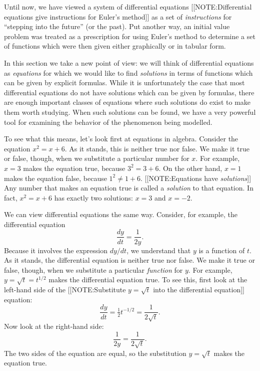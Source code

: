 Until now, we have viewed a system of differential equations
[[NOTE:Differential equations give instructions for Euler's method]]
as a set of {\em instructions\/} for ``stepping into the future'' (or
the past).  Put another way, an initial value problem was treated as a
prescription for using Euler's method to
determine a set of functions which were then given either graphically
or in tabular form.

In this section we take a new point of view: we will think of
differential equations as {\em equations\/} for which
we would like to find {\em solutions} in terms of
functions which can be given by explicit formulas.  While it is
unfortunately the case that most differential equations do not have
solutions which can be given by formulas, there are enough important
classes of equations where such solutions do exist to make them worth
studying.  When such solutions can be found, we have a very powerful
tool for examining the behavior of the phenomenon being modelled.

To see what this means, let's look first at equations in algebra.
Consider the equation $x^2 = x + 6$.  As it stands, this is neither
true nor false.  We make it true or false, though, when we substitute
a particular number for $x$.  For example, $x = 3$ makes the equation
true, because $3^2 = 3 + 6$.  On the other hand, $x = 1$ makes the
equation false, because $1^2 \neq 1 + 6$.
[[NOTE:Equations have {\em solutions}]]
Any number that makes an equation true is called a {\em solution\/} to
that equation.  In fact, $x^2 = x + 6$ has exactly two solutions: $x =
3$ and $x = -2$.

We can view differential equations the same way.  Consider, for
example, the differential equation
	\[
\dfrac{dy}{dt} = \dfrac{1}{2y}.
\]
Because it involves the expression $dy/dt$, we understand that $y$ is a function of $t$.  As it stands, the differential equation is neither true nor false.  We make it true or false, though, when we substitute a particular {\em function\/} for $y$.  For example, $y = \sqrt{t} = t^{1/2}$ makes the differential equation true.  To see this, first look at the left-hand side of the 
[[NOTE:Substitute $y = \sqrt{t}$  into the differential equation]]
equation:
	\[
\dfrac{dy}{dt} = \tfrac{1}{2} t^{-1/2} = 
		\dfrac{1}{2 \sqrt{t}}.
\]
Now look at the right-hand side:
	\[
\dfrac{1}{2y} = \dfrac{1}{2\sqrt{t}}.
\]
The two sides of the equation are equal, so the substitution $y = \sqrt{t}$ makes the equation true.

